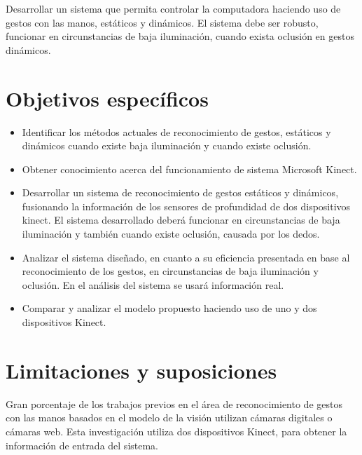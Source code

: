 Desarrollar un sistema que permita controlar la computadora haciendo uso de gestos con las manos, estáticos y dinámicos. El sistema debe ser robusto, funcionar en circunstancias de baja iluminación, cuando exista oclusión en gestos dinámicos.



\section{Objetivos espec\'ificos}\label{sec:objetivosEspecificos}

\begin{itemize}
	\item Identificar los m\'etodos actuales de reconocimiento de gestos, estáticos y din\'amicos cuando existe baja iluminación  y cuando existe oclusión. 
	
	\item  Obtener conocimiento acerca del funcionamiento de sistema Microsoft Kinect.
	
	\item Desarrollar un sistema de reconocimiento de gestos estáticos y dinámicos, fusionando la información de los sensores de  profundidad de dos dispositivos kinect. El sistema desarrollado deberá funcionar en circunstancias de baja iluminación y también cuando existe oclusión, causada por los dedos. 
	
	\item Analizar el sistema dise\~nado, en cuanto a su eficiencia presentada en base al reconocimiento de los gestos, en circunstancias de baja iluminación y oclusión. En el análisis del sistema se usar\'a información real.  
	
	\item Comparar y analizar el modelo propuesto haciendo uso de uno y dos dispositivos Kinect. 
\end{itemize}



\section{Limitaciones y suposiciones}\label{sec:Limitaciones&Suposiciones}

Gran porcentaje de los trabajos previos en el \'area de reconocimiento de gestos con las manos basados en el modelo de la visión  utilizan c\'amaras digitales o c\'amaras web. Esta investigación utiliza dos dispositivos Kinect, para obtener la información de entrada del sistema.

